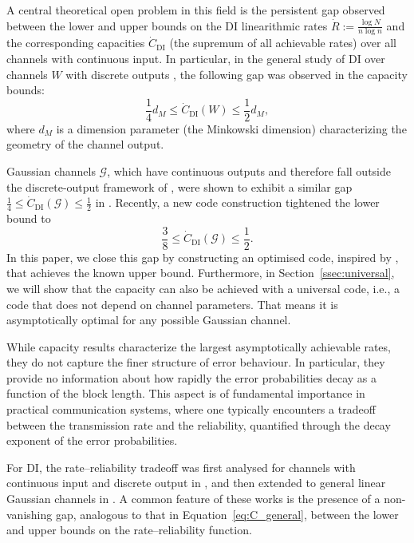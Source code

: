 \documentclass[10pt,conference]{IEEEtran}
\newcommand{\1}{\mathds{1}}
\newcommand{\cG}{\mathcal{G}}
\begin{document}
A central theoretical open problem in this field is the persistent gap observed between the lower and upper bounds on the DI linearithmic rates 
\(\dot{R} := \frac{\log N}{n \log n}\) and the corresponding capacities 
\(\dot{C}_{\text{DI}}\) (the supremum of all achievable rates) over all channels with continuous input. In particular, in the general study of DI over channels \(W\) with discrete outputs \cite{CDBW:DI_classical}, the following gap was observed in the capacity bounds:
\begin{equation}\label{eq:C_general}
\frac{1}{4} d_M \leq \dot{C}_{\text{DI}}(W) \leq \frac{1}{2} d_M,
\end{equation}
where \(d_M\) is a dimension parameter (the Minkowski dimension) characterizing the geometry of the channel output.

Gaussian channels \(\mathcal{G}\), which have continuous outputs and therefore fall outside the discrete-output framework of \cite{CDBW:DI_classical}, were shown to exhibit a similar gap
\(
\frac{1}{4} \leq \dot{C}_{\text{DI}}(\mathcal{G}) \leq \frac{1}{2}
\)
in \cite{SPBD:DI_power,DI-fading}. Recently, a new code construction \cite{galaxy-codes} tightened the lower bound to 
\begin{equation}\label{eq:C_galaxy_old}
\frac38\leq\dot{C}_\text{DI}(\cG)\leq\frac12.
\end{equation}
In this paper, we close this gap by constructing an optimised code, inspired by \cite{galaxy-codes}, that achieves the known upper bound.
%
Furthermore, in Section~\ref{ssec:universal}, we will show that the capacity can also be achieved with a universal code, i.e., a code that does not depend on channel parameters. That means it is asymptotically optimal for any possible Gaussian channel.


While capacity results characterize the largest asymptotically achievable rates, they do not capture the finer structure of error behaviour. In particular, they provide no information about how rapidly the error probabilities decay as a function of the block length. This aspect is of fundamental importance in practical communication systems, where one typically encounters a tradeoff between the transmission rate and the reliability, quantified through the decay exponent of the error probabilities.

For DI, the rate–reliability tradeoff was first analysed for channels with continuous input and discrete output in \cite{CDBW:Reliability-TCOM, DI-steins}, and then extended to general linear Gaussian channels in \cite{RRGauss-arXiv}. A common feature of these works is the presence of a non-vanishing gap, analogous to that in Equation~\eqref{eq:C_general}, between the lower and upper bounds on the rate–reliability function.
\end{document}
